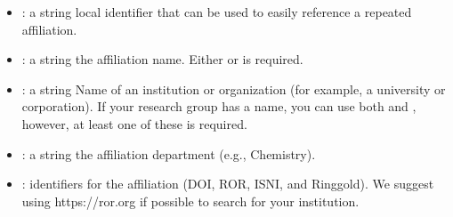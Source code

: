 \documentclass[letterpaper,12pt,english]{sphinxmanual}
\begin{document}
\begin{itemize}
\item {} 
\sphinxAtStartPar
{} : a string \sphinxhyphen{} local identifier that can be used to easily reference a repeated affiliation.

\item {} 
\sphinxAtStartPar
{} : a string \sphinxhyphen{} the affiliation name. Either  or  is required.

\item {} 
\sphinxAtStartPar
{} : a string \sphinxhyphen{} Name of an institution or organization (for example, a university or corporation). If your research group has a name, you can use both  and , however, at least one of these is required.

\item {} 
\sphinxAtStartPar
{} : a string \sphinxhyphen{} the affiliation department (e.g., Chemistry).

\item {} 
\sphinxAtStartPar
{} : identifiers for the affiliation (DOI, ROR, ISNI, and Ringgold). We suggest using https://ror.org if possible to search for your institution.

\end{itemize}
\end{document}
